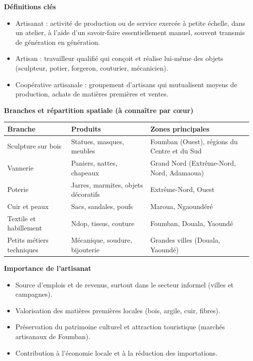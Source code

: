 \documentclass[11pt]{article}
\newcommand{\cle}[1]{{\popxbold\color{popdark}#1}}
\begin{document}
\begin{bilan}
\textbf{Définitions clés}
\begin{itemize}
\item \cle{Artisanat} : activité de production ou de service exercée à petite échelle, dans un atelier, à l'aide d'un \cle{savoir-faire} essentiellement manuel, souvent transmis de génération en génération.
\item \cle{Artisan} : travailleur qualifié qui conçoit et réalise lui-même des objets (sculpteur, potier, forgeron, couturier, mécanicien).
\item \cle{Coopérative artisanale} : groupement d'artisans qui mutualisent moyens de production, achats de matières premières et ventes.
\end{itemize}

\textbf{Branches et répartition spatiale (à connaître par cœur)}
\begin{center}
\begin{tabularx}{\linewidth}{|l|X|X|}\hline
\rowcolor{popblueL} \textbf{Branche} & \textbf{Produits} & \textbf{Zones principales} \\ \hline
Sculpture sur bois & Statues, masques, meubles & Foumban (Ouest), régions du Centre et du Sud \\ \hline
Vannerie & Paniers, nattes, chapeaux & Grand Nord (Extrême-Nord, Nord, Adamaoua) \\ \hline
Poterie & Jarres, marmites, objets décoratifs & Extrême-Nord, Ouest \\ \hline
Cuir et peaux & Sacs, sandales, poufs & Maroua, Ngaoundéré \\ \hline
Textile et habillement & Ndop, tissus, couture & Foumban, Douala, Yaoundé \\ \hline
Petits métiers techniques & Mécanique, soudure, bijouterie & Grandes villes (Douala, Yaoundé) \\ \hline
\end{tabularx}
\end{center}

\textbf{Importance de l'artisanat}
\begin{itemize}
\item Source d'\cle{emplois} et de revenus, surtout dans le secteur informel (villes et campagnes).
\item Valorisation des \cle{matières premières locales} (bois, argile, cuir, fibres).
\item Préservation du \cle{patrimoine culturel} et attraction touristique (marchés artisanaux de Foumban).
\item Contribution à l'économie locale et à la réduction des importations.
\end{itemize}


\end{bilan}
\end{document}
